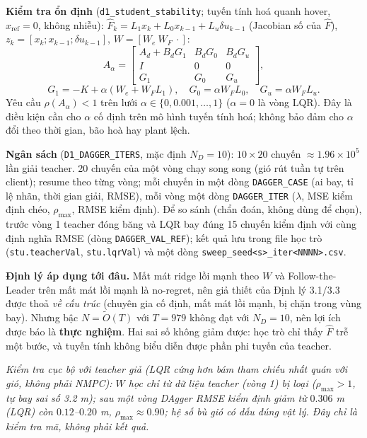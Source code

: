 \documentclass[11pt]{article}
\begin{document}
\textbf{Kiểm tra ổn định} (\texttt{d1\_student\_stability}; tuyến tính hoá quanh hover, $x_{\mathrm{ref}}=0$,
không nhiễu): $\hat F_k=L_1x_k+L_0x_{k-1}+L_u\delta u_{k-1}$ (Jacobian số của $\hat F$), $z_k=[x_k;x_{k-1};\delta
u_{k-1}]$, $W=[W_e\ W_F\ \cdot]$:
\[
A_\alpha=\begin{bmatrix}A_d+B_dG_1 & B_dG_0 & B_dG_u\\ I&0&0\\ G_1&G_0&G_u\end{bmatrix},
\]
\[
G_1=-K+\alpha(W_e+W_FL_1),\quad G_0=\alpha W_FL_0,\quad G_u=\alpha W_FL_u .
\]
Yêu cầu $\rho(A_\alpha)<1$ trên lưới $\alpha\in\{0,0.001,\dots,1\}$ ($\alpha=0$ là vòng LQR). Đây là điều kiện cần
cho $\alpha$ cố định trên mô hình tuyến tính hoá; không bảo đảm cho $\alpha$ đổi theo thời gian, bão hoà hay plant
lệch.

\textbf{Ngân sách} (\texttt{D1\_DAGGER\_ITERS}, mặc định $N_D=10$): $10\times20$ chuyến $\approx1.96\times10^5$
lần giải teacher. 20 chuyến của một vòng chạy song song (gió rút tuần tự trên client); resume theo từng vòng; mỗi chuyến in một dòng \texttt{DAGGER\_CASE} (ai bay, tỉ lệ nhãn,
thời gian giải, RMSE), mỗi vòng một dòng \texttt{DAGGER\_ITER} ($\lambda$, MSE kiểm định chéo,
$\rho_{\max}$, RMSE kiểm định). Để so sánh (chẩn đoán, không dùng để chọn), trước vòng 1 teacher đóng băng và LQR
bay đúng 15 chuyến kiểm định với cùng định nghĩa RMSE (dòng \texttt{DAGGER\_VAL\_REF}); kết quả lưu trong file học
trò (\texttt{stu.teacherVal}, \texttt{stu.lqrVal}) và một dòng \texttt{sweep\_seed<s>\_iter<NNNN>.csv}.

\textbf{Định lý áp dụng tới đâu.} Mất mát ridge lồi mạnh theo $W$ và Follow-the-Leader trên mất mát lồi mạnh là
no-regret, nên giả thiết của Định lý 3.1/3.3 được thoả \emph{về cấu trúc} (chuyên gia cố định, mất mát lồi
mạnh, bị chặn trong vùng bay). Nhưng bậc $N=\tilde O(T)$ với $T=979$ không đạt với $N_D=10$, nên lợi ích được báo
là \textbf{thực nghiệm}. Hai sai số không giảm được: học trò chỉ thấy $\hat F$ trễ một bước, và tuyến tính không
biểu diễn được phần phi tuyến của teacher.

{\small\itshape Kiểm tra cục bộ với teacher giả (LQR cứng hơn bám tham chiếu nhất quán với gió, không phải
NMPC): $W$ học chỉ từ dữ liệu teacher (vòng 1) bị loại ($\rho_{\max}>1$, tự bay sai số 3.2 m); sau một vòng
DAgger RMSE kiểm định giảm từ $0.306$ m (LQR) còn $0.12$--$0.20$ m, $\rho_{\max}\approx0.90$; hệ số bù gió có dấu
đúng vật lý. Đây chỉ là kiểm tra mã, không phải kết quả.}

\end{document}
